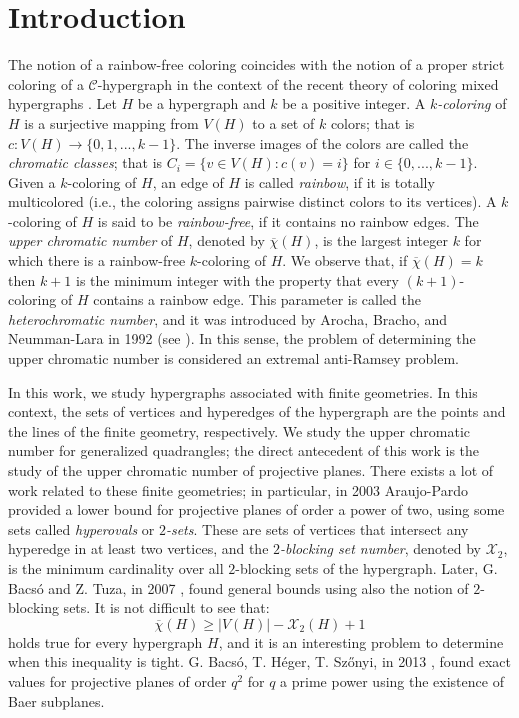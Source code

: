 \documentclass[12pt]{article}
\begin{document}
\section{Introduction}
The notion of a rainbow-free coloring \cite{jnr} coincides with the notion of a proper strict coloring of a $\mathcal{C}$-hypergraph in the context of the recent theory of coloring mixed hypergraphs \cite{v}. Let $H$ be a hypergraph and $k$ be a positive integer. A \emph{$k$-coloring} of $H$ is a surjective mapping from $V(H)$ to a set of $k$ colors; that is $c:V(H)\to \{0,1,...,k-1\}$. The inverse images
of the colors are called the \emph{chromatic classes}; that is $C_i=\{v \in
V(H): c(v)=i\}$ for $i\in\{0,...,k-1\}$.  Given a  
$k$-coloring of $H$, an edge of $H$ is called \emph{rainbow},  if it is
totally multicolored (i.e., the coloring assigns pairwise distinct colors to its
vertices). A $k$-coloring of $H$ is said to be \emph{rainbow-free}, if it
contains no rainbow edges. The  \emph{upper chromatic number} of $H$, denoted
by $\overline{\chi}(H)$, is the largest integer $k$ for which there is a
rainbow-free $k$-coloring of $H$. We observe that, if  $\overline{\chi}(H)= k$ then $k+1$ is
the minimum integer with the property that every $(k+1)$-coloring
of $H$ contains a rainbow edge. This parameter is called the \emph{heterochromatic number}, and it was introduced by Arocha, Bracho, and Neumman-Lara in 1992 (see \cite{abn}). In this sense, the problem of determining the
upper chromatic number is considered 
an extremal anti-Ramsey problem.

In this work, we study hypergraphs associated with finite geometries. In this context, the sets of vertices and hyperedges of the hypergraph are the points and the lines of the finite geometry, respectively. We study the upper chromatic number for generalized quadrangles; the direct antecedent of this work is the study of the upper chromatic number of projective planes. There exists a lot of work related to these finite geometries; in particular, in 2003 Araujo-Pardo \cite{daisyPP} provided a lower bound for projective planes of order a power of two, using some sets called \emph{hyperovals} or \emph{$2$-sets}. These are sets of vertices that intersect any hyperedge in at least two vertices, and the {\emph{$2$-blocking set number}}, denoted by $\mathcal{X}_2$, is the minimum cardinality over all $2$-blocking sets of the hypergraph. Later, G. Bacs\'{o} and Z. Tuza, in 2007 \cite{bt}, found general bounds using also the notion of $2$-blocking sets.
It is not difficult to see that:
\begin{equation}\label{eq:natural} \overline{\chi}(H)\geq |V(H)|-\mathcal{X}_2(H)+1\end{equation} 
holds true for every hypergraph $H$, and it is an interesting problem to determine when this inequality is tight. G. Bacs\'{o}, T. H\'{e}ger, T. Sz\H{o}nyi, in 2013 \cite{bhs}, found exact values for projective planes of order $q^2$ for $q$ a prime power using the existence of Baer subplanes.
\end{document}
